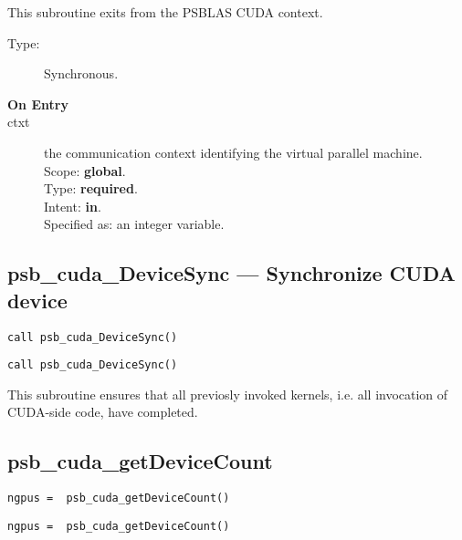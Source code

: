 This subroutine exits from the  PSBLAS CUDA context.
\begin{description}
\item[Type:] Synchronous.
\item[\bf  On Entry ]
\item[ctxt] the communication context identifying the virtual
  parallel machine.\\
Scope: {\bf global}.\\
Type: {\bf required}.\\
Intent: {\bf in}.\\
Specified as: an integer variable.
\end{description}




\subsection*{psb\_cuda\_DeviceSync ---  Synchronize CUDA device}

\ifpdf
\begin{verbatim}
call psb_cuda_DeviceSync()
\end{verbatim}
\else
\begin{center}
    \begin{minipage}[tl]{0.9\textwidth}
\begin{verbatim} 
call psb_cuda_DeviceSync()
\end{verbatim}
    \end{minipage}
  \end{center}
\fi

This subroutine ensures that all previosly invoked kernels, i.e. all
invocation of CUDA-side code, have completed.


\subsection*{psb\_cuda\_getDeviceCount }

\ifpdf
\begin{verbatim}
ngpus =  psb_cuda_getDeviceCount()
\end{verbatim}
\else
\begin{center}
    \begin{minipage}[tl]{0.9\textwidth}
\begin{verbatim} 
ngpus =  psb_cuda_getDeviceCount()
\end{verbatim}
    \end{minipage}
  \end{center}
\fi

